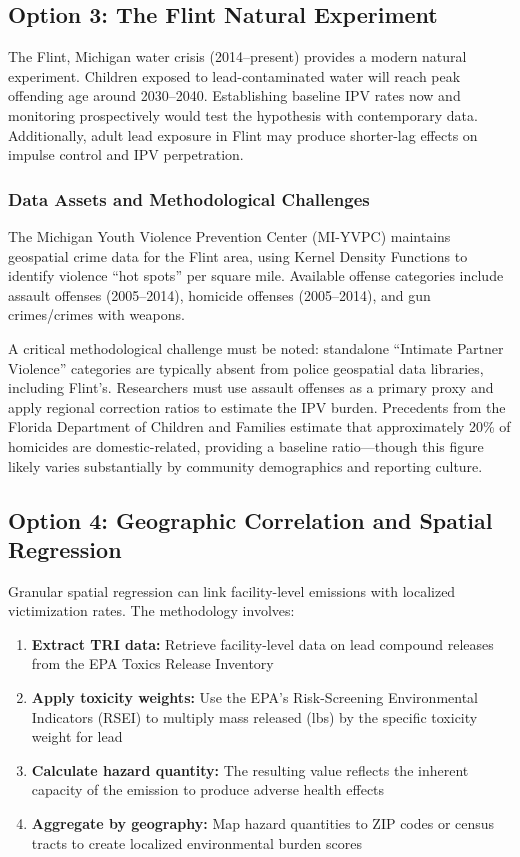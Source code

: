 \documentclass[12pt, letterpaper]{article}
\begin{document}
\subsection{Option 3: The Flint Natural Experiment}

The Flint, Michigan water crisis (2014--present) provides a modern natural experiment. Children exposed to lead-contaminated water will reach peak offending age around 2030--2040. Establishing baseline IPV rates now and monitoring prospectively would test the hypothesis with contemporary data. Additionally, adult lead exposure in Flint may produce shorter-lag effects on impulse control and IPV perpetration.

\subsubsection{Data Assets and Methodological Challenges}

The Michigan Youth Violence Prevention Center (MI-YVPC) maintains geospatial crime data for the Flint area, using Kernel Density Functions to identify violence ``hot spots'' per square mile. Available offense categories include assault offenses (2005--2014), homicide offenses (2005--2014), and gun crimes/crimes with weapons.

A critical methodological challenge must be noted: standalone ``Intimate Partner Violence'' categories are typically absent from police geospatial data libraries, including Flint's. Researchers must use assault offenses as a primary proxy and apply regional correction ratios to estimate the IPV burden. Precedents from the Florida Department of Children and Families estimate that approximately 20\% of homicides are domestic-related, providing a baseline ratio---though this figure likely varies substantially by community demographics and reporting culture.

\subsection{Option 4: Geographic Correlation and Spatial Regression}

Granular spatial regression can link facility-level emissions with localized victimization rates. The methodology involves:
\begin{enumerate}[nosep]
    \item \textbf{Extract TRI data:} Retrieve facility-level data on lead compound releases from the EPA Toxics Release Inventory
    \item \textbf{Apply toxicity weights:} Use the EPA's Risk-Screening Environmental Indicators (RSEI) to multiply mass released (lbs) by the specific toxicity weight for lead
    \item \textbf{Calculate hazard quantity:} The resulting value reflects the inherent capacity of the emission to produce adverse health effects
    \item \textbf{Aggregate by geography:} Map hazard quantities to ZIP codes or census tracts to create localized environmental burden scores
\end{enumerate}
\end{document}
